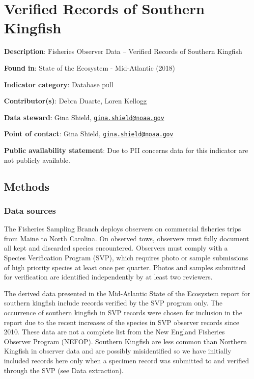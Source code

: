\documentclass[
]{book}
\begin{document}
\hypertarget{verified-records-of-southern-kingfish}{%
\chapter{Verified Records of Southern Kingfish}\label{verified-records-of-southern-kingfish}}

\textbf{Description}: Fisheries Observer Data -- Verified Records of Southern Kingfish

\textbf{Found in}: State of the Ecosystem - Mid-Atlantic (2018)

\textbf{Indicator category}: Database pull

\textbf{Contributor(s)}: Debra Duarte, Loren Kellogg

\textbf{Data steward}: Gina Shield, \href{mailto:gina.shield@noaa.gov}{\nolinkurl{gina.shield@noaa.gov}}

\textbf{Point of contact}: Gina Shield, \href{mailto:gina.shield@noaa.gov}{\nolinkurl{gina.shield@noaa.gov}}

\textbf{Public availability statement}: Due to PII concerns data for this indicator are not publicly available.

\hypertarget{methods-26}{%
\section{Methods}\label{methods-26}}

\hypertarget{data-sources-26}{%
\subsection{Data sources}\label{data-sources-26}}

The Fisheries Sampling Branch deploys observers on commercial fisheries trips from Maine to North Carolina. On observed tows, observers must fully document all kept and discarded species encountered. Observers must comply with a Species Verification Program (SVP), which requires photo or sample submissions of high priority species at least once per quarter. Photos and samples submitted for verification are identified independently by at least two reviewers.

The derived data presented in the Mid-Atlantic State of the Ecosystem report for southern kingfish include records verified by the SVP program only. The occurrence of southern kingfish in SVP records were chosen for inclusion in the report due to the recent increases of the species in SVP observer records since 2010. These data are not a complete list from the New England Fisheries Observer Program (NEFOP). Southern Kingfish are less common than Northern Kingfish in observer data and are possibly misidentified so we have initially included records here only when a specimen record was submitted to and verified through the SVP (see Data extraction).
\end{document}
